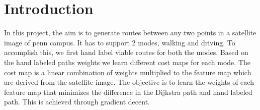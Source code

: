 \documentclass[fleqn,10pt]{SelfArx} %
\begin{document}
\flushbottom %

\maketitle %

\tableofcontents %

\thispagestyle{empty} %

\section{Introduction}
In this project, the aim is to generate routes between any two points in a satellite image of penn campus. It has to support 2 modes, walking and driving. To accomplish this, we first hand label viable routes for both the modes. Based on the hand labeled paths weights we learn different cost maps for each mode. The cost map is a linear combination of weights multiplied to the feature map which are derived from the satellite image. The objective is to learn the weights of each feature map that minimizes the difference in the Dijkstra path and hand labeled path. This is achieved through gradient decent.
\end{document}
